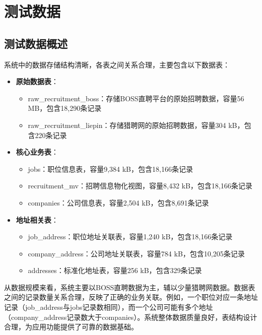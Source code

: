 \section{测试数据}


\subsection{测试数据概述}
系统中的数据存储结构清晰，各表之间关系合理，主要包含以下数据表：

\begin{itemize}
    \item \textbf{原始数据表}：
    \begin{itemize}
        \item raw\_recruitment\_boss：存储BOSS直聘平台的原始招聘数据，容量56 MB，包含18,290条记录
        \item raw\_recruitment\_liepin：存储猎聘网的原始招聘数据，容量304 kB，包含220条记录
    \end{itemize}
    
    \item \textbf{核心业务表}：
    \begin{itemize}
        \item jobs：职位信息表，容量9,384 kB，包含18,166条记录
        \item recruitment\_mv：招聘信息物化视图，容量8,432 kB，包含18,166条记录
        \item companies：公司信息表，容量2,504 kB，包含8,691条记录
    \end{itemize}
    
    \item \textbf{地址相关表}：
    \begin{itemize}
        \item job\_address：职位地址关联表，容量1,240 kB，包含18,166条记录
        \item company\_address：公司地址关联表，容量784 kB，包含10,205条记录
        \item addresses：标准化地址表，容量256 kB，包含329条记录
    \end{itemize}

\end{itemize}


从数据规模来看，系统主要以BOSS直聘数据为主，辅以少量猎聘网数据。数据表之间的记录数量关系合理，反映了正确的业务关联。例如，一个职位对应一条地址记录（job\_address与jobs记录数相同），而一个公司可能有多个地址（company\_address记录数大于companies）。系统整体数据质量良好，表结构设计合理，为应用功能提供了可靠的数据基础。

